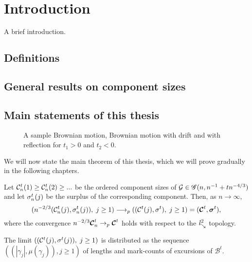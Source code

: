 
\chapter{Introduction}

A brief introduction.
\lipsum[100]

\section{Definitions}

\section{General results on component sizes}

\section{Main statements of this thesis}

\begin{figure}%
	\centering
	\subfloat[$W(s)$]{}%
	\quad
	\subfloat[$W^{t_1}(s)$]{}%
	\quad
	\subfloat[$B^{t_1}(s)$]{}%
	\quad
	\subfloat[$W^{t_2}(s)$]{}%
	\quad
	\subfloat[$B^{t_2}(s)$]{}%
	\caption{A sample Brownian motion, Brownian motion with drift and with reflection for $t_1>0$ and $t_2<0$.}%
	\label{F: BM}%
\end{figure}

We will now state the main theorem of this thesis, which we will prove gradually in the following chapters.
\begin{theorem}
	Let 
	$\mathcal{C}^t_n(1) \geq \mathcal{C}^t_n(2) \geq ... $ 
	be the ordered component sizes of 
	$\mathcal{G} \in \mathscr{G}(n, n^{-1} + tn^{-4/3})$
	and let
	$\mathcal{\sigma}^t_n(j)$ 
	be the surplus of the corresponding component.
	Then, as $n \longrightarrow \infty$,
	\begin{equation}
	( n^{-2 / 3} ( \mathcal{C}^t_n(j), \mathcal{\sigma}^t_n(j) ), \; j \geq 1 ) 
	\longrightarrow_p
	( (\mathcal{C}^t(j), \mathcal{\sigma}^t), \; j \geq 1 )
	= ( \boldsymbol{\mathcal{C}}^t, \boldsymbol{\mathcal{\sigma}}^t ),
	\end{equation}
	where the convergence 
	$n^{-2 / 3} \boldsymbol{\mathcal{C}}^t_n \rightarrow_p \boldsymbol{\mathcal{C}}^t$
	holds with respect to the $\mathit{l}^2_{\searrow}$ topology.
	
	The limit
	$\left( ( \mathcal{C}^t(j), \mathcal{\sigma}^t(j) ), \; j \geq 1 \right)$
	is distributed as the sequence
	$ \left( (|\gamma_j|, \mu(\gamma_j)), j \geq 1  \right) $
	of lengths and mark-counts of excursions of $\mathcal{B}^t$.
\end{theorem}